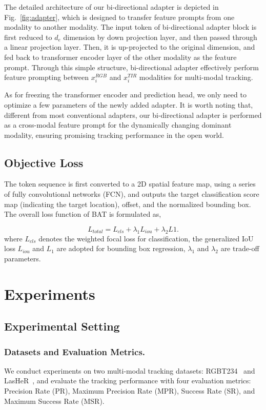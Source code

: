 \documentclass[letterpaper]{article} %
\begin{document}
The detailed architecture of our bi-directional adapter is depicted in Fig.~\ref{fig:adapter}, which is designed to transfer feature prompts from one modality to another modality.
The input token of bi-directional adapter block is first reduced to $d_e$ dimension by down projection layer, and then passed through a linear projection layer.
Then, it is up-projected to the original dimension, and fed back to transformer encoder layer of the other modality as the feature prompt. Through this simple structure, bi-directional adapter effectively perform feature prompting between $x_{i}^{RGB}$ and $x_{i}^{TIR}$ modalities for multi-modal tracking.

As for freezing the transformer encoder and prediction head, we only need to optimize a few parameters of the newly added adapter. It is worth noting that, different from most conventional adapters, our bi-directional adapter is performed as a cross-modal feature prompt for the dynamically changing dominant modality, ensuring promising tracking performance in the open world.




\subsection{Objective Loss}

The token sequence is first converted to a 2D spatial feature map, using a series of fully convolutional networks (FCN), and outputs the target classification score map (indicating the target location), offset, and the normalized bounding box.
The overall loss function of BAT is formulated as,

\begin{equation}
L_{total} = L_{cls} + \lambda_1L_{iou} + \lambda_2L1.
\end{equation}
where $L_{cls}$ denotes the weighted focal loss for classification, the generalized IoU loss $L_{iou}$ and $L_1$ are adopted for bounding box regression, ${\lambda}_{1}$ and ${\lambda}_2$ are trade-off parameters.



\section{Experiments}

\subsection{Experimental Setting}
\subsubsection{Datasets and Evaluation Metrics.}
We conduct experiments on two multi-modal tracking datasets: RGBT234~\cite{rgbt234} and LasHeR~\cite{LasHeR}, and evaluate the tracking performance with four evaluation metrics: Precision Rate (PR), Maximum Precision Rate (MPR), Success Rate (SR), and Maximum Success Rate (MSR).
\end{document}
